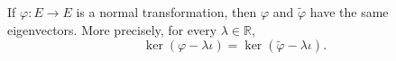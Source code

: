 If $\varphi: E \rightarrow E$ is a normal transformation, then $\varphi$ and $\tilde{\varphi}$ have the same eigenvectors. More precisely, for every $\lambda \in \mathbb{R}$,
$$\ker(\varphi - \lambda \iota) = \ker(\tilde{\varphi} - \lambda \iota).$$
